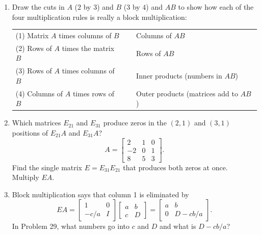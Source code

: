 \documentclass[14pt, a4paper]{article}
\begin{document}
\begin{enumerate}[resume]
    \item Draw the cuts in $A$ ($2$ by $3$) and $B$ ($3$ by $4$) and $AB$ to show how each of the four multiplication rules is really a block multiplication:
          \begin{center}
              \begin{tabular}{lcl}
                  (1) Matrix $A$ times columns of $B$  & \quad & Columns of $AB$                       \\
                  (2) Rows of $A$ times the matrix $B$ & \quad & Rows of $AB$                          \\
                  (3) Rows of $A$ times columns of $B$ & \quad & Inner products (numbers in $AB$)      \\
                  (4) Columns of $A$ times rows of $B$ & \quad & Outer products (matrices add to $AB$)
              \end{tabular}
          \end{center}

    \item Which matrices $E_{21}$ and $E_{31}$ produce zeros in the $(2,1)$ and $(3,1)$ positions of $E_{21}A$ and $E_{31}A$?
          \[
              A = \begin{bmatrix} 2 & 1 & 0 \\ -2 & 0 & 1 \\ 8 & 5 & 3 \end{bmatrix}.
          \]
          Find the single matrix $E = E_{31}E_{21}$ that produces both zeros at once. Multiply $EA$.

    \item Block multiplication says that column 1 is eliminated by
          \[
              EA = \begin{bmatrix} 1 & 0 \\ -c/a & I \end{bmatrix}
              \begin{bmatrix} a & b \\ c & D \end{bmatrix}
              = \begin{bmatrix} a & b \\ 0 & D - cb/a \end{bmatrix}.
          \]
          In Problem 29, what numbers go into $c$ and $D$ and what is $D - cb/a$?


\end{enumerate}
\end{document}
